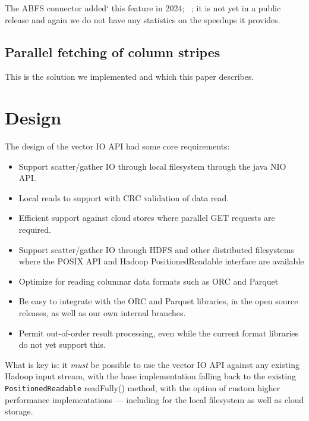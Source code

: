 \documentclass[manuscript]{acmart}
\begin{document}
The ABFS connector added` this feature in 2024;
\ \cite{HADOOP-18971}; it is not yet in a public release and
again we do not have any statistics on the speedups it provides.


\subsection{Parallel fetching of column stripes}\label{subsec:parallel-fetching-of-column-stripes}

This is the solution we implemented and which this paper describes.




\section{Design}
\label{sec:design}

The design of the vector IO API had some core requirements:
\begin{itemize}
  \item Support scatter/gather IO through local filesystem through the java NIO API.
  \item Local reads to support with CRC validation of data read.
  \item Efficient support against cloud stores where parallel GET requests are required.
  \item Support scatter/gather IO through HDFS and other distributed filesystems
        where the POSIX API and Hadoop PositionedReadable interface are available
  \item Optimize for reading columnar data formats such as ORC and Parquet
  \item Be easy to integrate with the ORC and Parquet libraries, in the open
        source releases, as well as our own internal branches.
  \item Permit out-of-order result processing, even while the current format libraries
        do not yet support this.
\end{itemize}

What is key is: it \emph{must} be possible to use the vector IO API against
any existing Hadoop input stream, with the base implementation
falling back to the existing \texttt{PositionedReadable} readFully() method,
with the option of custom higher performance implementations --- including
for the local filesystem as well as cloud storage.
\end{document}
